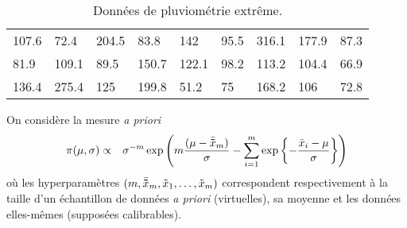 \begin{table}[h!]
\centering
\begin{tabular}{lllllllll}
\hline
107.6  &  72.4 &    204.5   &  83.8 &    142 &    95.5  &   316.1 &  177.9 &    87.3 \\
81.9   & 109.1 &   89.5      & 150.7  & 122.1 & 98.2      & 113.2    & 104.4  & 66.9  \\
136.4 & 275.4 & 125         & 199.8 & 51.2 &75     & 168.2    & 106       & 72.8 \\
\hline
\end{tabular}
\caption{Données de pluviométrie extrême.}
\label{data}
\end{table}


On considère la mesure {\it a priori}
\begin{eqnarray*}
\pi(\mu,\sigma) & \propto & \sigma^{-m}\exp\left(m\frac{(\mu-\bar{\bf\tilde{x}}_m)}{\sigma}-\sum\limits_{i=1}^{m} \exp\left\{-\frac{\tilde{x}_i-\mu}{\sigma}\right\}\right)
\end{eqnarray*} 
o\`u les hyperparam\`etres $(m,\bar{\bf\tilde{x}}_m,\tilde{x}_1,\ldots,\tilde{x}_m)$ correspondent respectivement \`a la taille d'un \'echantillon de donn\'ees {\it a priori} (virtuelles), sa moyenne et les donn\'ees elles-m\^emes (supposées calibrables). 
